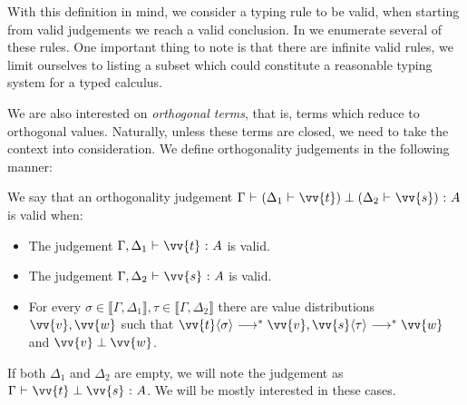 \documentclass[runningheads,orivec,envcountsame,envcountsect]{llncs}
\newcommand\lra{\longrightarrow}
\newcommand\ansubst[2]{\ensuremath{\langle #1 \rangle_{#2}}}
\def\eval{\lra^*}
\def\sem#1{\llbracket#1\rrbracket}
\def\TYP#1#2#3{#1~{\vdash}~#2~{:}~#3}
\def\SORTH#1#2#3#4{#1~{\vdash}~#2\perp#3~{:}~#4}
\def\ORTH#1#2#3#4#5#6{#1~{\vdash}~(#2~{\vdash}~#3)\perp(#4~{\vdash}~#5)~{:}~#6}
\begin{document}
With this definition in mind, we consider a typing rule to be valid, when starting from valid judgements we reach a valid conclusion. In  we enumerate several of these rules. One important thing to note is that there are infinite valid rules, we limit ourselves to listing a subset which could constitute a reasonable typing system for a typed calculus.

We are also interested on \emph{orthogonal terms}, that is, terms which reduce to orthogonal values. Naturally, unless these terms are closed, we need to take the context into consideration. We define orthogonality judgements in the following manner:

\begin{definition}
    We say that an orthogonality judgement $\ORTH{\Gamma}{\Delta_1}{\vv{t}}{\Delta_2}{\vv{s}}{A}$ is valid when:
    \begin{itemize}
        \item The judgement $\TYP{\Gamma,\Delta_1}{\vv{t}}{A}$ is valid.
        \item The judgement $\TYP{\Gamma,\Delta_2}{\vv{s}}{A}$ is valid.
        \item For every $\sigma\in\sem{\Gamma,\Delta_1}, \tau\in\sem{\Gamma,\Delta_2}$ there are value distributions $\vv{v},\vv{w}$ such that $\vv{t}\ansubst{\sigma}{}\eval\vv{v}, \vv{s}\ansubst{\tau}{}\eval\vv{w}$ and $\vv{v}\perp\vv{w}$.
    \end{itemize}
\end{definition}

If both $\Delta_1$ and $\Delta_2$ are empty, we will note the judgement as $\SORTH{\Gamma}{\vv{t}}{\vv{s}}{A}$. We will be mostly interested in these cases.
\end{document}
